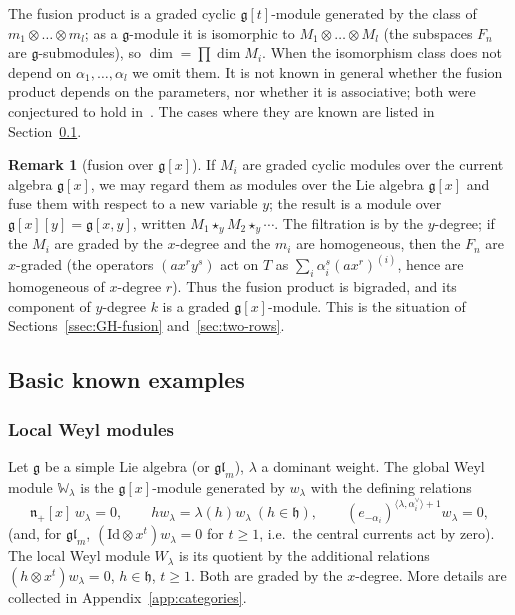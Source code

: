 \documentclass[11pt]{amsart}
\numberwithin{equation}{section}
\theoremstyle{definition}
\newtheorem{remark}[equation]{Remark}
\newcommand{\gl}{\mathfrak{gl}}
\newcommand{\fg}{\mathfrak{g}}
\newcommand{\fh}{\mathfrak{h}}
\newcommand{\fn}{\mathfrak{n}}
\newcommand{\bW}{\mathbb{W}}          %
\begin{document}
	The fusion product is a graded cyclic $\fg[t]$-module generated by the class of $m_1\otimes\dots\otimes m_l$; as a $\fg$-module it is isomorphic to $M_1\otimes\dots\otimes M_l$ (the subspaces $F_n$ are $\fg$-submodules), so $\dim=\prod\dim M_i$. When the isomorphism class does not depend on $\alpha_1,\dots,\alpha_l$ we omit them. It is not known in general whether the fusion product depends on the parameters, nor whether it is associative; both were conjectured to hold in~\cite{FeLo}. The cases where they are known are listed in Section~\ref{ssec:examples}.
	
	\begin{remark}[fusion over {$\fg[x]$}]\label{rem:fusion-xy}
		If $M_i$ are graded cyclic modules over the current algebra $\fg[x]$, we may regard them as modules over the Lie algebra $\fg[x]$ and fuse them with respect to a new variable $y$; the result is a module over $\fg[x][y]=\fg[x,y]$, written $M_1\star_yM_2\star_y\cdots$. The filtration is by the $y$-degree; if the $M_i$ are graded by the $x$-degree and the $m_i$ are homogeneous, then the $F_n$ are $x$-graded (the operators $(a x^ry^s)$ act on $T$ as $\sum_i\alpha_i^s(ax^r)^{(i)}$, hence are homogeneous of $x$-degree $r$). Thus the fusion product is bigraded, and its component of $y$-degree $k$ is a graded $\fg[x]$-module. This is the situation of Sections~\ref{ssec:GH-fusion} and~\ref{sec:two-rows}.
	\end{remark}
	
	\subsection{Basic known examples}\label{ssec:examples}
	
	\subsubsection{Local Weyl modules}\label{sssec:weyl}
	Let $\fg$ be a simple Lie algebra (or $\gl_m$), $\lambda$ a dominant weight. The global Weyl module $\bW_\lambda$ is the $\fg[x]$-module generated by $w_\lambda$ with the defining relations
	\[
	\fn_+[x]\,w_\lambda=0,\qquad hw_\lambda=\lambda(h)w_\lambda\ (h\in\fh),\qquad (e_{-\alpha_i})^{\langle\lambda,\alpha_i^\vee\rangle+1}w_\lambda=0,
	\]
	(and, for $\gl_m$, $(\mathrm{Id}\otimes x^t)w_\lambda=0$ for $t\ge1$, i.e.\ the central currents act by zero). The local Weyl module $W_\lambda$ is its quotient by the additional relations $(h\otimes x^t)w_\lambda=0$, $h\in\fh$, $t\ge1$. Both are graded by the $x$-degree. More details are collected in Appendix~\ref{app:categories}.
	
\end{document}
